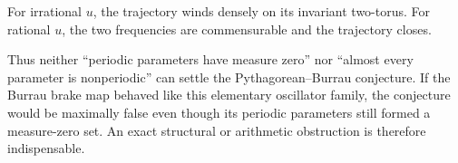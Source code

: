 \documentclass[11pt]{article}
\begin{document}
For irrational \(u\), the trajectory winds densely on its invariant
two-torus.  For rational \(u\), the two frequencies are commensurable and the
trajectory closes.

\begin{center}
  \color{deepblue}
\end{center}

Thus neither ``periodic parameters have measure zero'' nor ``almost every
parameter is nonperiodic'' can settle the Pythagorean--Burrau conjecture.  If
the Burrau brake map behaved like this elementary oscillator family, the
conjecture would be maximally false even though its periodic parameters still
formed a measure-zero set.  An exact structural or arithmetic obstruction is
therefore indispensable.
\end{document}
